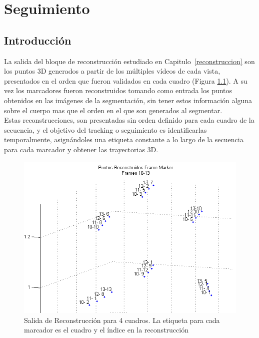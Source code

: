 \chapter{Seguimiento}
\label{seguimiento}
\section{Introducción}

La salida del bloque de reconstrucción estudiado en Capitulo~\ref{reconstruccion} son los puntos 3D generados a partir de los múltiples vídeos de cada vista, presentados en el orden que fueron validados en cada cuadro (Figura \ref{reconstr_00}). A su vez los marcadores fueron reconstruidos tomando como entrada los puntos obtenidos en las imágenes de la segmentación, sin tener estos información alguna sobre el cuerpo mas que el orden en el que son generados al segmentar.
\\ 

Estas reconstrucciones, son presentadas sin orden definido para cada cuadro de la secuencia, y el objetivo del tracking o seguimiento es identificarlas temporalmente, asignándoles una etiqueta constante a lo largo de la secuencia para cada marcador y obtener las trayectorias 3D.

\begin{figure}[H]
\begin{center}
\includegraphics[scale=0.6]{img/Tracking/00_Salida_Reconstruccion.png}
\end{center}
\caption{Salida de Reconstrucción para 4 cuadros. La etiqueta para cada marcador es el cuadro y el índice en la reconstrucción}
\label{reconstr_00}
\end{figure}

